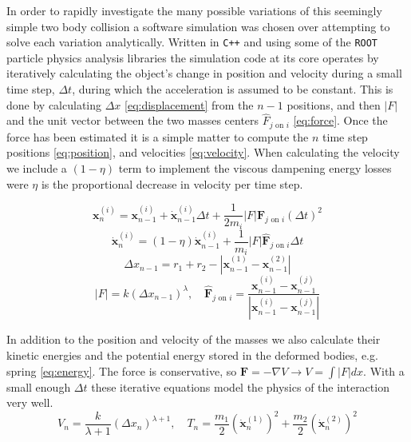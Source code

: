\documentclass[aps,prl,floatfix,preprint,nofootinbib]{revtex4}
\begin{document}
In order to rapidly investigate the many possible variations of this seemingly simple two body collision a software simulation was chosen over attempting to solve each variation analytically. Written in \texttt{C++} and using some of the \texttt{ROOT}~\cite{ref_root} particle physics analysis libraries the simulation code at its core operates by iteratively calculating the object's change in position and velocity during a small time step, $\Delta t$, during which the acceleration is assumed to be constant. This is done by calculating $\Delta x$ \eqref{eq:displacement} from the $n-1$ positions, and then $\left|F\right|$ and the unit vector between the two masses centers $\hat{F}_{j\text{ on }i}$ \eqref{eq:force}. Once the force has been estimated it is a simple matter to compute the $n$ time step positions \eqref{eq:position}, and velocities \eqref{eq:velocity}. When calculating the velocity we include a $\left(1-\eta\right)$ term to implement the viscous dampening energy losses were $\eta$ is the proportional decrease in velocity per time step.

\begin{equation}\label{eq:position}
  \mathbf{x}^{(i)}_{n} = \mathbf{x}^{(i)}_{n-1} + \dot{\mathbf{x}}^{(i)}_{n-1} \Delta t + \frac{1}{2m_i} \left| F \right| \mathbf{\hat{F}}_{j\text{ on }i} \left(\Delta t\right)^2
\end{equation}
\begin{equation}\label{eq:velocity}
  \dot{\mathbf{x}}^{(i)}_{n} = (1-\eta)\dot{\mathbf{x}}^{(i)}_{n-1} + \frac{1}{m_i} \left| F \right| \mathbf{\hat{F}}_{j\text{ on }i} \Delta t
\end{equation}
\begin{equation}\label{eq:displacement}
  \Delta x_{n-1} = r_1 + r_2 - \left| \mathbf{x}^{(1)}_{n-1}-\mathbf{x}^{(2)}_{n-1} \right|
\end{equation}
\begin{equation}\label{eq:force}
  \left| F \right| = k \left(\Delta x_{n-1}\right)^{\lambda},\quad \mathbf{\hat{F}}_{j\text{ on }i} = \frac{\mathbf{x}^{(i)}_{n-1}-\mathbf{x}^{(j)}_{n-1}}{\left|\mathbf{x}^{(i)}_{n-1}-\mathbf{x}^{(j)}_{n-1}\right|}
\end{equation}

In addition to the position and velocity of the masses we also calculate their kinetic energies and the potential energy stored in the deformed bodies, e.g. spring \eqref{eq:energy}. The force is conservative, so $\mathbf{F} = - \nabla V \rightarrow V = \int \left|F\right| dx$. With a small enough $\Delta t$ these iterative equations model the physics of the interaction very well. 
\begin{equation}\label{eq:energy}
  V_n = \frac{k}{\lambda+1}\left(\Delta x_n\right)^{\lambda+1},\quad T_n = \frac{m_1}{2}\left(\dot{\mathbf{x}}^{(1)}_n\right)^2 + \frac{m_2}{2}\left(\dot{\mathbf{x}}^{(2)}_n\right)^2
\end{equation}
\end{document}
